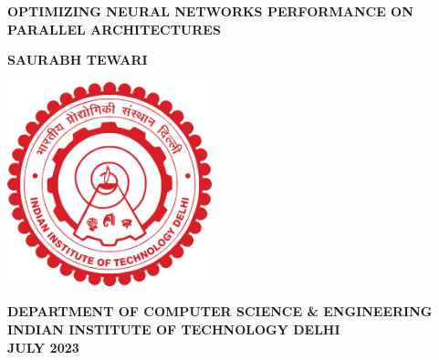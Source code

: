 \begin{titlepage}

\begin{center}


\LARGE 

\MakeUppercase{\textbf{OPTIMIZING NEURAL NETWORKS
		PERFORMANCE ON PARALLEL
		ARCHITECTURES}}\\

\vspace{3cm}

\LARGE

\textbf{SAURABH TEWARI} 

\vspace{6cm}
\hspace{0cm}
\hbox{\includegraphics[width=14pc]{ThesisSpecificPages/iitd-logo.pdf}}
\vspace{1cm}

\large{\bf DEPARTMENT OF COMPUTER SCIENCE \& ENGINEERING}\\
\large{\bf INDIAN INSTITUTE OF TECHNOLOGY DELHI}\\
\large{\bf JULY 2023}\\

\end{center}

\end{titlepage}
